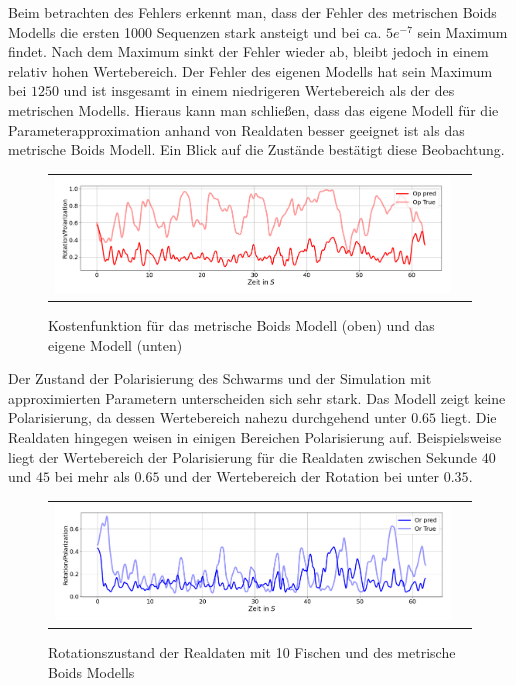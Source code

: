 Beim betrachten des Fehlers erkennt man, dass der Fehler des metrischen Boids Modells die ersten 1000 Sequenzen stark ansteigt und bei ca. $5e^{-7}$ sein Maximum findet. Nach dem Maximum sinkt der Fehler wieder ab, bleibt jedoch in einem relativ hohen Wertebereich. Der Fehler des eigenen Modells hat sein Maximum bei $1250$ und ist insgesamt in einem niedrigeren Wertebereich als der des metrischen Modells. Hieraus kann man schließen, dass das eigene Modell für die Parameterapproximation anhand von Realdaten besser geeignet ist als das metrische Boids Modell. Ein Blick auf die Zustände bestätigt diese Beobachtung.

\begin{figure}[H]
\centering
\begin{tabular}{cc}
\includegraphics[width=1.0\textwidth]{figures/Experimente/Realdaten/Boids_10F_zust_Pol.png} 
\end{tabular}
\caption{Kostenfunktion für das metrische Boids Modell (oben) und das eigene Modell (unten)\label{fig:10Fisch_boids_Pol}}
\end{figure}

Der Zustand der Polarisierung des Schwarms und der Simulation mit approximierten Parametern unterscheiden sich sehr stark.
Das Modell zeigt keine Polarisierung, da dessen Wertebereich nahezu durchgehend unter $0.65$ liegt. Die Realdaten hingegen weisen in einigen Bereichen Polarisierung auf. Beispielsweise liegt der Wertebereich der Polarisierung für die Realdaten zwischen Sekunde $40$ und $45$ bei mehr als $0.65$ und der Wertebereich der Rotation bei unter $0.35$.

\begin{figure}[H]
\centering
\begin{tabular}{cc}
\includegraphics[width=1.0\textwidth]{figures/Experimente/Realdaten/Boids_10F_zust_Rot.png} 
\end{tabular}
\caption{Rotationszustand der Realdaten mit 10 Fischen und des metrische Boids Modells\label{fig:10Fisch_rot_boids}}
\end{figure}

